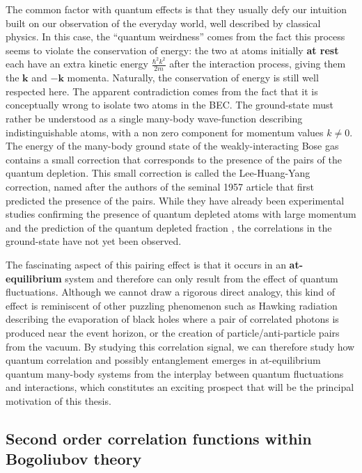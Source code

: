 The common factor with quantum effects is that they usually defy our intuition built on our observation of the everyday world, well described by classical physics. In this case, the ``quantum weirdness'' comes from the fact this process seems to violate the conservation of energy: the two at atoms initially \textbf{at rest} each have an extra kinetic energy $\frac{\hbar^2 k^2}{2m}$ after the interaction process, giving them the $\bm{k}$ and $-\bm{k}$ momenta. Naturally, the conservation of energy is still well respected here. The apparent contradiction comes from the fact that it is conceptually wrong to isolate two atoms in the BEC. The ground-state must rather be understood as a single many-body wave-function describing indistinguishable atoms, with a non zero component for momentum values $k \neq 0$. The energy of the many-body ground state of the weakly-interacting Bose gas contains a small correction that corresponds to the presence of the \kmk pairs of the quantum depletion. This small correction is called the Lee-Huang-Yang correction, named after the authors of the seminal 1957 article \cite{lee1957} that first predicted the presence of the \kmk pairs. While they have already been experimental studies confirming the presence of quantum depleted atoms with large momentum \cite{sokol1995,xu2006} and the prediction of the quantum depleted fraction \cite{lopes2017}, the \kmk correlations in the ground-state have not yet been observed.

The fascinating aspect of this \kmk pairing effect is that it occurs in an \textbf{at-equilibrium} system and therefore can only result from the effect of quantum fluctuations. Although we cannot draw a rigorous direct analogy, this kind of effect is reminiscent of other puzzling phenomenon such as Hawking radiation \cite{hawking1974} describing the evaporation of black holes where a pair of correlated photons is produced near the event horizon, or the creation of particle/anti-particle pairs from the vacuum. By studying this \kmk correlation signal, we can therefore study how quantum correlation and possibly entanglement emerges in at-equilibrium quantum many-body systems from the interplay between quantum fluctuations and interactions, which constitutes an exciting prospect that will be the principal motivation of this thesis.





\subsection{Second order correlation functions within Bogoliubov theory}

